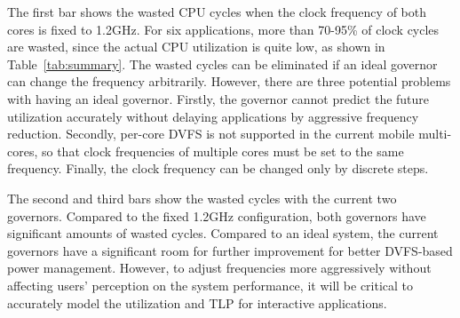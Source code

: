 The first bar shows the wasted CPU cycles when the clock frequency of both cores is fixed to
1.2GHz. For six applications, more than 70-95\% of clock cycles are wasted, since the actual
CPU utilization is quite low, as shown in Table~\ref{tab:summary}. 
The wasted cycles can be eliminated if an ideal governor can change the frequency arbitrarily. 
However, there are three potential problems with having an ideal governor. Firstly,
the governor cannot predict the future utilization accurately without delaying applications
by aggressive frequency reduction. Secondly, per-core DVFS is not supported in the current
mobile multi-cores, so that clock frequencies
of multiple cores must be set to the same frequency. Finally, the clock frequency can be changed
only by discrete steps.

The second and third bars show the wasted cycles with the current two governors. 
Compared to the fixed 1.2GHz configuration, both governors have significant amounts of
wasted cycles. Compared to an ideal system, the current governors have a significant room for further 
improvement for better DVFS-based power management. However, to adjust frequencies more aggressively
without affecting users' perception on the system performance, it will be 
critical to accurately model the utilization and TLP for interactive applications. 

